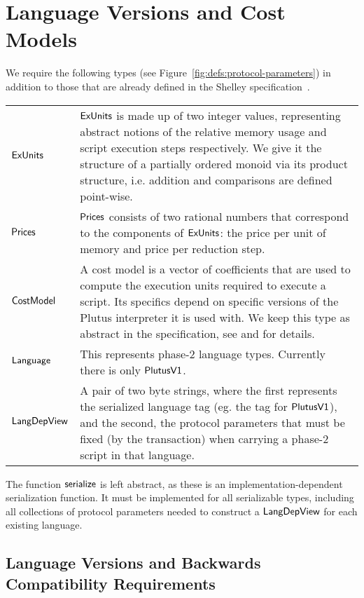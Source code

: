 \section{Language Versions and Cost Models}
\label{sec:protocol-parameters}

We require the following types (see Figure~\ref{fig:defs:protocol-parameters})
in addition to those that are already defined in the Shelley specification~\cite{shelley_spec}.

\vspace{12pt}
\begin{tabular}{lp{5in}}
  $\mathsf{ExUnits}$ &
  $\mathsf{ExUnits}$ is made up of two integer values, representing abstract notions of the
  relative memory usage and script execution steps respectively.
  We give it the structure of a partially ordered monoid via its product structure,
  i.e. addition and comparisons are defined point-wise.
  \\
  $\mathsf{Prices}$ &
  $\mathsf{Prices}$ consists of two rational numbers that correspond to the components of $\mathsf{ExUnits}$:
  the price per unit of memory and price per reduction step.
  \\
  $\mathsf{CostModel}$ &
  A cost model is a vector of coefficients that are used to compute
  the execution units required to execute a script. Its specifics depend on
  specific versions of the Plutus interpreter it is used with.
  We keep this type as abstract in the specification, see \cite{plutuscore} and \cite{plutustech}
  for details.
  \\
  $\mathsf{Language}$ &
  This represents phase-2 language types. Currently there is only $\mathsf{PlutusV1}$.
  \\
  $\mathsf{LangDepView}$ &
  A pair of two byte strings, where the first represents the serialized language tag (eg. the tag for $\mathsf{PlutusV1}$),
  and the second, the protocol parameters that must be fixed (by the transaction) when carrying a phase-2 script
  in that language.
\end{tabular}

The function $\mathsf{serialize}$ is left abstract, as
these is an implementation-dependent serialization function. It must
be implemented for all serializable types, including all
collections of protocol parameters needed to construct a $\mathsf{LangDepView}$ for
each existing language.

\subsection{Language Versions and Backwards Compatibility Requirements}
\label{sec:versions}

